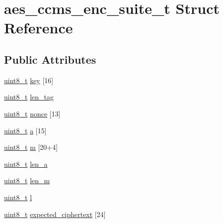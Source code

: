 \hypertarget{structaes__ccms__enc__suite__t}{}\section{aes\+\_\+ccms\+\_\+enc\+\_\+suite\+\_\+t Struct Reference}
\label{structaes__ccms__enc__suite__t}
\subsection*{Public Attributes}
\begin{DoxyCompactItemize}
\item 
\hyperlink{_p_e___types_8h_aba7bc1797add20fe3efdf37ced1182c5}{uint8\+\_\+t} \hyperlink{structaes__ccms__enc__suite__t_aad585814cddfafdb51b93affd7b94c65}{key} \mbox{[}16\mbox{]}
\item 
\hyperlink{_p_e___types_8h_aba7bc1797add20fe3efdf37ced1182c5}{uint8\+\_\+t} \hyperlink{structaes__ccms__enc__suite__t_acb24be0bfbdc874dab8ab1d28f3316cc}{len\+\_\+tag}
\item 
\hyperlink{_p_e___types_8h_aba7bc1797add20fe3efdf37ced1182c5}{uint8\+\_\+t} \hyperlink{structaes__ccms__enc__suite__t_a241213bc91df055057be51ed169e0a99}{nonce} \mbox{[}13\mbox{]}
\item 
\hyperlink{_p_e___types_8h_aba7bc1797add20fe3efdf37ced1182c5}{uint8\+\_\+t} \hyperlink{structaes__ccms__enc__suite__t_a2a300c3f4e7f798480b98527aa89895b}{a} \mbox{[}15\mbox{]}
\item 
\hyperlink{_p_e___types_8h_aba7bc1797add20fe3efdf37ced1182c5}{uint8\+\_\+t} \hyperlink{structaes__ccms__enc__suite__t_a7088aa21f27354139c84201c2a96210c}{m} \mbox{[}20+4\mbox{]}
\item 
\hyperlink{_p_e___types_8h_aba7bc1797add20fe3efdf37ced1182c5}{uint8\+\_\+t} \hyperlink{structaes__ccms__enc__suite__t_a17dd6afc7f2c39214654762ad1ab9f6a}{len\+\_\+a}
\item 
\hyperlink{_p_e___types_8h_aba7bc1797add20fe3efdf37ced1182c5}{uint8\+\_\+t} \hyperlink{structaes__ccms__enc__suite__t_acd7f0eaf4ae125ad0e76cc7b0142beed}{len\+\_\+m}
\item 
\hyperlink{_p_e___types_8h_aba7bc1797add20fe3efdf37ced1182c5}{uint8\+\_\+t} \hyperlink{structaes__ccms__enc__suite__t_a29462cc3303d97004b99c42645c4e58b}{l}
\item 
\hyperlink{_p_e___types_8h_aba7bc1797add20fe3efdf37ced1182c5}{uint8\+\_\+t} \hyperlink{structaes__ccms__enc__suite__t_abc88e21647d477edf3b02f00fcc8b7bb}{expected\+\_\+ciphertext} \mbox{[}24\mbox{]}
\end{DoxyCompactItemize}


